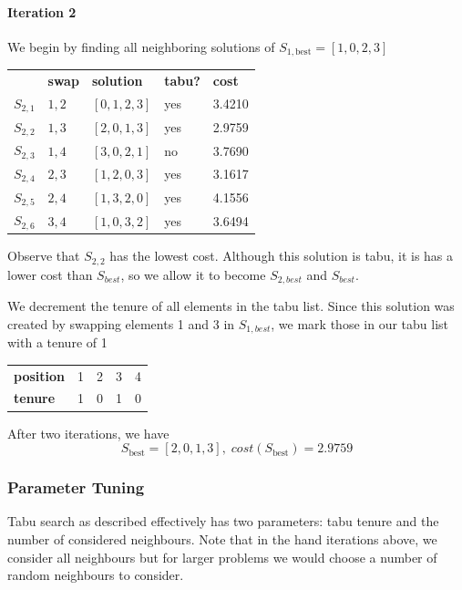 \documentclass[a4paper]{article}
\newcommand{\subsubsubsection}[1]{\paragraph{#1} \mbox{}}
\begin{document}
\subsubsubsection{Iteration 2}

We begin by finding all neighboring solutions of $S_{1, \text{best}} = [1, 0, 2, 3]$
\begin{center}
\begin{tabular}{lllll}
& \textbf{swap}   & \textbf{solution}    & \textbf{tabu?} & \textbf{cost}  \\
$S_{2,1}$ & $1,2$ & $[0, 1, 2, 3]$ & yes & 3.4210 \\
$S_{2,2}$ & $1,3$ & $[2, 0, 1, 3]$ & yes & 2.9759 \\
$S_{2,3}$ & $1,4$ & $[3, 0, 2, 1]$ & no  & 3.7690 \\
$S_{2,4}$ & $2,3$ & $[1, 2, 0, 3]$ & yes & 3.1617 \\
$S_{2,5}$ & $2,4$ & $[1, 3, 2, 0]$ & yes & 4.1556 \\
$S_{2,6}$ & $3,4$ & $[1, 0, 3, 2]$ & yes & 3.6494 \\
\end{tabular}
\end{center}
\vspace{1.5em}

Observe that $S_{2,2}$ has the lowest cost. Although this solution is tabu, it is has a lower cost than $S_\textit{best}$, so we allow it to become $S_{2, \textit{best}}$ and $S_\textit{best}$.

We decrement the tenure of all elements in the tabu list. Since this solution was created by swapping elements 1 and 3 in $S_{1, \textit{best}}$, we mark those in our tabu list with a tenure of 1

\begin{center}
\begin{tabular}{lllll}
\textbf{position} & 1 & 2 & 3 & 4 \\
\textbf{tenure}   & 1 & 0 & 1 & 0
\end{tabular}
\end{center}
\vspace{1.5em}

After two iterations, we have
$$S_{\text{best}} = [2, 0, 1, 3], \; \textit{cost}(S_{\text{best}}) = 2.9759$$

\subsubsection{Parameter Tuning}

Tabu search as described effectively has two parameters: tabu tenure and the number of considered neighbours. Note that in the hand iterations above, we consider all neighbours but for larger problems we would choose a number of random neighbours to consider.
\end{document}
